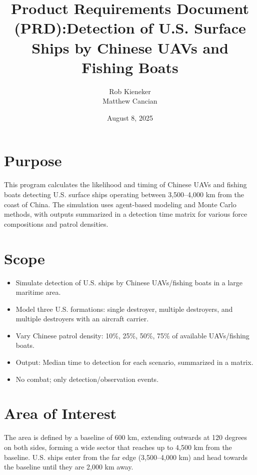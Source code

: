 \documentclass[12pt]{article}
\title{Product Requirements Document (PRD):\newline Detection of U.S. Surface Ships by Chinese UAVs and Fishing Boats}
\author{Rob Kieneker \\ Matthew Cancian}
\date{August 8, 2025}
\begin{document}
\maketitle

\section{Purpose}
This program calculates the likelihood and timing of Chinese UAVs and fishing boats detecting U.S. surface ships operating between 3,500--4,000 km from the coast of China. The simulation uses agent-based modeling and Monte Carlo methods, with outputs summarized in a detection time matrix for various force compositions and patrol densities.

\section{Scope}
\begin{itemize}
	\item Simulate detection of U.S. ships by Chinese UAVs/fishing boats in a large maritime area.
	\item Model three U.S. formations: single destroyer, multiple destroyers, and multiple destroyers with an aircraft carrier.
	\item Vary Chinese patrol density: 10\%, 25\%, 50\%, 75\% of available UAVs/fishing boats.
	\item Output: Median time to detection for each scenario, summarized in a matrix.
	\item No combat; only detection/observation events.
\end{itemize}

\section{Area of Interest}
The area is defined by a baseline of 600 km, extending outwards at 120 degrees on both sides, forming a wide sector that reaches up to 4,500 km from the baseline. U.S. ships enter from the far edge (3,500--4,000 km) and head towards the baseline until they are 2,000 km away.
\end{document}
